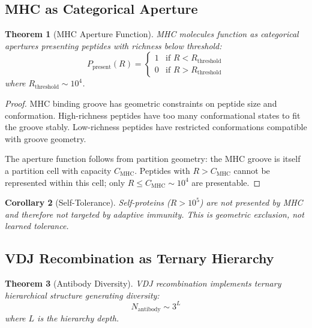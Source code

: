 \documentclass[10pt,twocolumn]{article}
\theoremstyle{plain}
\newtheorem{theorem}{Theorem}[section]
\newtheorem{corollary}[theorem]{Corollary}
\theoremstyle{definition}
\theoremstyle{remark}
\begin{document}
\subsection{MHC as Categorical Aperture}

\begin{theorem}[MHC Aperture Function]
\label{thm:mhc}
MHC molecules function as categorical apertures presenting peptides with richness below threshold:
\begin{equation}
P_{\mathrm{present}}(R) = \begin{cases}
1 & \text{if } R < R_{\mathrm{threshold}} \\
0 & \text{if } R > R_{\mathrm{threshold}}
\end{cases}
\label{eq:mhc}
\end{equation}
where $R_{\mathrm{threshold}} \sim 10^4$.
\end{theorem}

\begin{proof}
MHC binding groove has geometric constraints on peptide size and conformation. High-richness peptides have too many conformational states to fit the groove stably. Low-richness peptides have restricted conformations compatible with groove geometry.

The aperture function follows from partition geometry: the MHC groove is itself a partition cell with capacity $C_{\mathrm{MHC}}$. Peptides with $R > C_{\mathrm{MHC}}$ cannot be represented within this cell; only $R \leq C_{\mathrm{MHC}} \sim 10^4$ are presentable.
\end{proof}

\begin{corollary}[Self-Tolerance]
\label{cor:tolerance}
Self-proteins ($R > 10^5$) are not presented by MHC and therefore not targeted by adaptive immunity. This is geometric exclusion, not learned tolerance.
\end{corollary}

\subsection{VDJ Recombination as Ternary Hierarchy}

\begin{theorem}[Antibody Diversity]
\label{thm:antibody}
VDJ recombination implements ternary hierarchical structure generating diversity:
\begin{equation}
N_{\mathrm{antibody}} \sim 3^L
\label{eq:antibody}
\end{equation}
where $L$ is the hierarchy depth.
\end{theorem}
\end{document}
